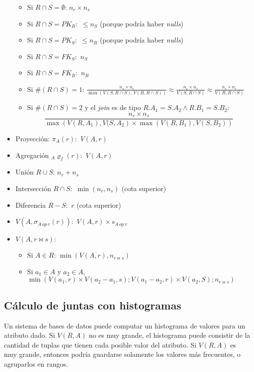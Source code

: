 \documentclass[a4paper, twoside]{article}
\begin{document}
\begin{itemize}
\begin{itemize}
\item Si $R\cap S=\emptyset$: $n_{r}\times n_{s}$
\item Si $R\cap S=PK_{R}:$ $\leq n_{S}$ (porque podría haber \emph{nulls})
\item Si $R\cap S=PK_{S}:$ $\leq n_{R}$ (porque podría haber \emph{nulls})
\item Si $R\cap S=FK_{S}:$ $n_{S}$
\item Si $R\cap S=FK_{R}:$ $n_{R}$
\item Si $\#(R\cap S)=1$: $\frac{n_{s}\times n_{r}}{\max\left(V(S,R\cap S),V(R,R\cap S)\right)}\approx\frac{n_{s}\times n_{r}}{V(S,R\cap S)}\approx\frac{n_{s}\times n_{r}}{V(R,R\cap S)}$
\item Si $\#(R\cap S)=2$ y el \emph{join} es de tipo $R.A_{1}=S.A_{2}\wedge R.B_{1}=S.B_{2}$:
\[
\frac{n_{r}\times n_{s}}{\max\left(V(R,A_{1}),V(S,A_{2}\right)\times\max\left(V(R,B_{1}),V(S,B_{2})\right)}
\]

\end{itemize}
\item Proyección: $\pi_{A}(r):$ $V(A,r)$
\item Agregación $_{A}\varrho_{f}(r):$ $V(A,r)$
\item Unión $R\cup S$: $n_{r}+n_{s}$
\item Intersección $R\cap S:$ $\min\left(n_{r},n_{s}\right)$ (cota superior)
\item Diferencia $R-S:$ $r$ (cota superior)
\item $V\left(A,\sigma_{A\, op\, v}(r)\right):$ $V(A,r)\times s_{A\, op\, v}$
\item $V\left(A,r\bowtie s\right):$ 

\begin{itemize}
\item Si $A\in R$: $\min\left(V(A,r),n_{r\bowtie s}\right)$
\item Si $a_{1}\in A$ y $a_{2}\in A$, $\min\left(V(a_{1},r)\times V(a_{2}-a_{1},s);V(a_{1}-a_{2},r)\times V(a_{2},S);n_{r\bowtie s}\right)$
\end{itemize}
\end{itemize}

\subsection{Cálculo de juntas con histogramas}

Un sistema de bases de datos puede computar un histograma de valores
para un atributo dado. Si $V(R,A)$ no es muy grande, el histograma
puede consistir de la cantidad de tuplas que tienen cada posible valor
del atributo. Si $V(R,A)$ es muy grande, entonces podría guardarse
solamente los valores más frecuentes, o agruparlos en rangos.
\end{document}
